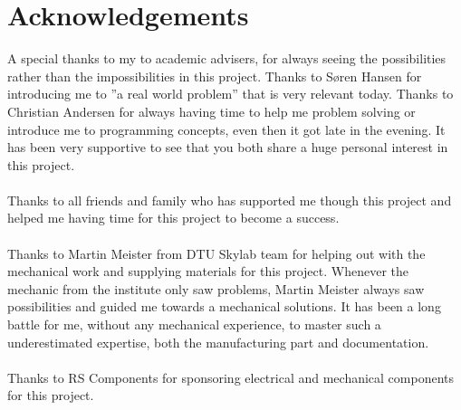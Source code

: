 \chapter{Acknowledgements}
A special thanks to my to academic advisers, for always seeing the possibilities rather than the impossibilities in this project. Thanks to Søren Hansen for introducing me to ''a real world problem'' that is very relevant today. Thanks to Christian Andersen for always having time to help me problem solving or introduce me to programming concepts, even then it got late in the evening. It has been very supportive to see that you both share a huge personal interest in this project.\\ 
\\
Thanks to all friends and family who has supported me though this project and helped me having time for this project to become a success. \\ 
\\
Thanks to Martin Meister from DTU Skylab team for helping out with the mechanical work and supplying materials for this project. Whenever the mechanic from the institute only saw problems, Martin Meister always saw possibilities and guided me towards a mechanical solutions. It has been a long battle for me, without any mechanical experience, to master such a underestimated expertise, both the manufacturing part and documentation. \\
\\
Thanks to RS Components for sponsoring electrical and mechanical components for this project. 